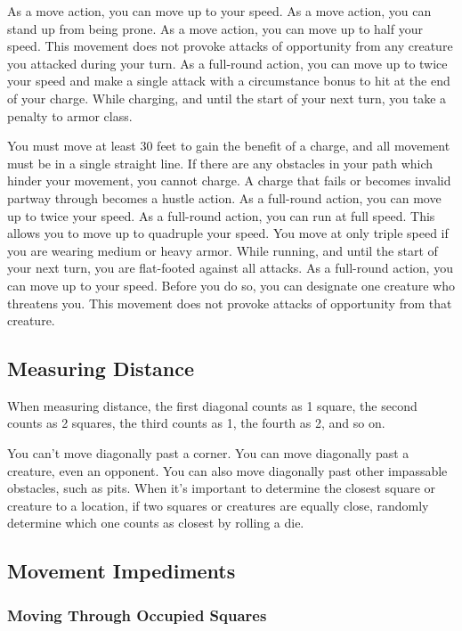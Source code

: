  As a move action, you can move up to your speed.
 As a move action, you can stand up from being prone.
 As a move action, you can move up to half your speed. This movement does not provoke attacks of opportunity from any creature you attacked during your turn.
 As a full-round action, you can move up to twice your speed and make a single attack with a  circumstance bonus to hit at the end of your charge. While charging, and until the start of your next turn, you take a  penalty to armor class.
\par You must move at least 30 feet to gain the benefit of a charge, and all movement must be in a single straight line. If there are any obstacles in your path which hinder your movement, you cannot charge. A charge that fails or becomes invalid partway through becomes a hustle action.
 As a full-round action, you can move up to twice your speed.
 As a full-round action, you can run at full speed. This allows you to move up to quadruple your speed. You move at only triple speed if you are wearing medium or heavy armor. While running, and until the start of your next turn, you are flat-footed against all attacks. 
 As a full-round action, you can move up to your speed. Before you do so, you can designate one creature who threatens you. This movement does not provoke attacks of opportunity from that creature.

\subsection{Measuring Distance}
 When measuring distance, the first diagonal counts
as 1 square, the second counts as 2 squares, the third counts as 1, the
fourth as 2, and so on.

You can't move diagonally past a corner. You can move diagonally past a creature, even an opponent. You can also move diagonally past other impassable obstacles, such as pits.
 When it's important to determine the closest square or creature to a location, if two squares or creatures are equally close, randomly determine which one counts as closest by rolling a die.

\subsection{Movement Impediments}

\subsubsection{Moving Through Occupied Squares}

